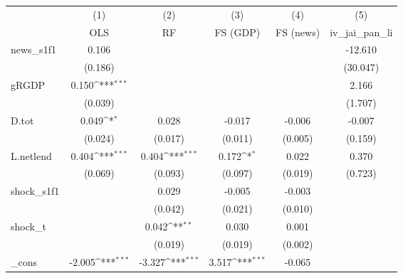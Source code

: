 {
\def\sym#1{\ifmmode^{#1}\else\(^{#1}\)\fi}
\begin{tabular}{l*{5}{c}}
\toprule
            &\multicolumn{1}{c}{(1)}&\multicolumn{1}{c}{(2)}&\multicolumn{1}{c}{(3)}&\multicolumn{1}{c}{(4)}&\multicolumn{1}{c}{(5)}\\
            &\multicolumn{1}{c}{OLS}&\multicolumn{1}{c}{RF}&\multicolumn{1}{c}{FS (GDP)}&\multicolumn{1}{c}{FS (news)}&\multicolumn{1}{c}{iv\_jai\_pan\_li}\\
\midrule
news\_s1f1   &       0.106         &                     &                     &                     &     -12.610         \\
            &     (0.186)         &                     &                     &                     &    (30.047)         \\
\addlinespace
gRGDP       &       0.150\sym{***}&                     &                     &                     &       2.166         \\
            &     (0.039)         &                     &                     &                     &     (1.707)         \\
\addlinespace
D.tot       &       0.049\sym{*}  &       0.028         &      -0.017         &      -0.006         &      -0.007         \\
            &     (0.024)         &     (0.017)         &     (0.011)         &     (0.005)         &     (0.159)         \\
\addlinespace
L.netlend   &       0.404\sym{***}&       0.404\sym{***}&       0.172\sym{*}  &       0.022         &       0.370         \\
            &     (0.069)         &     (0.093)         &     (0.097)         &     (0.019)         &     (0.723)         \\
\addlinespace
shock\_s1f1  &                     &       0.029         &      -0.005         &      -0.003         &                     \\
            &                     &     (0.042)         &     (0.021)         &     (0.010)         &                     \\
\addlinespace
shock\_t     &                     &       0.042\sym{**} &       0.030         &       0.001         &                     \\
            &                     &     (0.019)         &     (0.019)         &     (0.002)         &                     \\
\addlinespace
\_cons      &      -2.005\sym{***}&      -3.327\sym{***}&       3.517\sym{***}&      -0.065         &                     \\

\end{tabular}}
